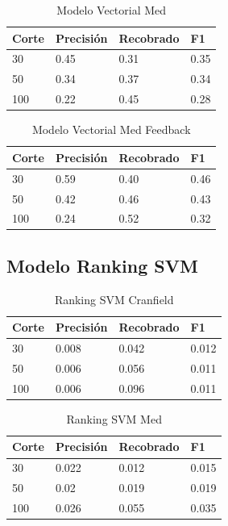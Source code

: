 \documentclass[runningheads]{llncs}
\begin{document}
\begin{table}
	\caption{Modelo Vectorial Med}\label{med_vec_result}
 \begin{tabular}{|l|l|l|l|}
 \hline
 	Corte &  Precisión & Recobrado & F1\\
 \hline
	30 & 0.45 & 0.31 & 0.35\\
	50 & 0.34 & 0.37 & 0.34\\
	100 & 0.22 & 0.45 & 0.28\\
 \hline
 \end{tabular}
\end{table}


\begin{table}
	\caption{Modelo Vectorial Med Feedback}\label{med_vec_feed_result}
 \begin{tabular}{|l|l|l|l|}
 \hline
 	Corte &  Precisión & Recobrado & F1\\
 \hline
	30 & 0.59 & 0.40 & 0.46\\
	50 & 0.42 & 0.46 & 0.43\\
	100 & 0.24 & 0.52 & 0.32\\
 \hline
 \end{tabular}
\end{table}

\newpage

\subsection{Modelo Ranking SVM}


\begin{table}
	\caption{Ranking SVM Cranfield}\label{cran_svm_result}
 \begin{tabular}{|l|l|l|l|}
 \hline
 	Corte &  Precisión & Recobrado & F1\\
 \hline
	30 & 0.008 & 0.042 & 0.012\\
	50 & 0.006 & 0.056 & 0.011\\
	100 & 0.006 & 0.096 & 0.011\\
 \hline
 \end{tabular}
\end{table}


\begin{table}
	\caption{Ranking SVM Med}\label{med_svm_result}
 \begin{tabular}{|l|l|l|l|}
 \hline
 	Corte &  Precisión & Recobrado & F1\\
 \hline
	30 & 0.022 & 0.012 & 0.015\\
	50 & 0.02 & 0.019 & 0.019\\
	100 & 0.026 & 0.055 & 0.035\\
 \hline
 \end{tabular}
\end{table}
\end{document}

